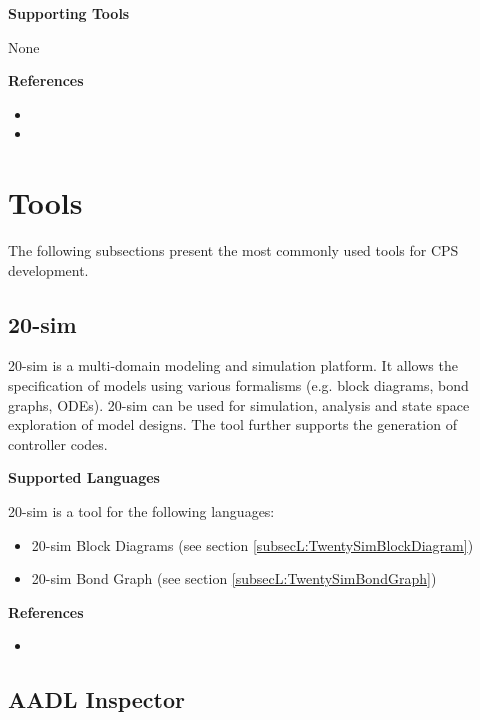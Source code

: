 \textbf{Supporting Tools}

None


\textbf{References}
\begin{itemize}
	
\item {}
	
\item {}
\end{itemize}
\section{Tools}
\label{sec:tools}

The following subsections present the most commonly used tools for CPS development.

\subsection{20-sim}
\label{subsecT:TwentySim}


20-sim is a multi-domain modeling and simulation platform. It allows the specification of models using various formalisms (e.g. block diagrams, bond graphs, ODEs). 20-sim can be used for simulation, analysis and state space exploration of model designs. The tool further supports the generation of controller codes.

\textbf{Supported Languages}

20-sim is a tool for the following languages:
\begin{itemize}
	\item 20-sim Block Diagrams (see section \ref{subsecL:TwentySimBlockDiagram})
	\item 20-sim Bond Graph (see section \ref{subsecL:TwentySimBondGraph})
\end{itemize}


\textbf{References}
\begin{itemize}
	
\item {}
\end{itemize}



\subsection{AADL Inspector}
\label{subsecT:AADLInspector}


